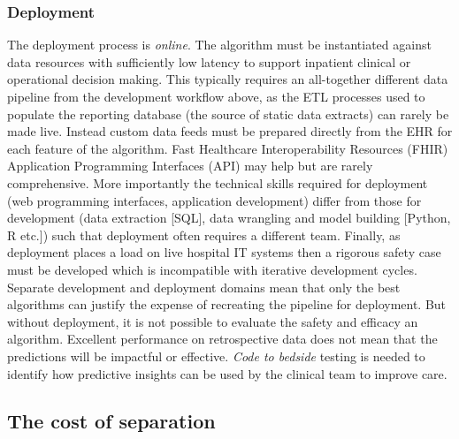 \documentclass[pmlr,twocolumn,10pt]{jmlr} %
\begin{document}
\subsubsection{Deployment}
The deployment process is \textit{online}. The algorithm must be instantiated against data resources with sufficiently low latency to support inpatient clinical or operational decision making. This typically requires an all-together different data pipeline from the development workflow above, as the ETL processes used to populate the reporting database (the source of static data extracts) can rarely be made live. Instead custom data feeds must be prepared directly from the EHR for each feature of the algorithm.\citep{sendak2020} Fast Healthcare Interoperability Resources (FHIR) Application Programming Interfaces (API) may help but are rarely comprehensive.\citep{jones2021} More importantly the technical skills required for deployment (web programming interfaces, application development) differ from those for development (data extraction [SQL], data wrangling and model building [Python, R etc.]) such that deployment often requires a different team. Finally, as deployment places a load on live hospital IT systems then a rigorous safety case must be developed which is incompatible with iterative development cycles.
Separate development and deployment domains mean that only the best algorithms can justify the expense of recreating the pipeline for deployment. But without deployment, it is not possible to evaluate the safety and efficacy an algorithm. Excellent performance on retrospective data does not mean that the predictions will be impactful or effective.\citep{the2021} \textit{Code to bedside} testing is needed to identify how predictive insights can be used by the clinical team to improve care.

\subsection{The cost of separation}
\end{document}
